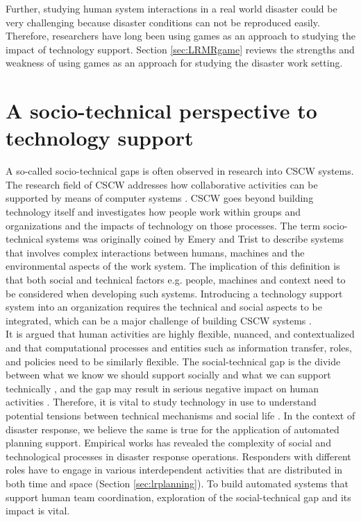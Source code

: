 Further, studying human system interactions in a real world disaster could be very challenging because disaster conditions can not be reproduced easily. Therefore, researchers have long been using games as an approach to studying the impact of technology support.  Section \ref{sec:LRMRgame} reviews the strengths and weakness of using games as an approach for studying the disaster work setting. \\


\section{A socio-technical perspective to technology support} \label{sec:LRSocialTechnical}

A so-called socio-technical gaps is often observed in research into \acf{CSCW} systems. The research field of \ac{CSCW} addresses how collaborative activities can be supported by means of computer systems \citep{Carstensen1999}.  \ac{CSCW} goes beyond building technology itself and investigates how people work within groups and organizations and the impacts of technology on those processes. The term socio-technical systems was originally coined by Emery and Trist \citep{Ropohl1999} to describe systems that involves complex interactions between humans, machines and the environmental aspects of the work system. The implication of this definition is that both social and technical factors e.g. people, machines and context need to be considered when developing such systems. Introducing a technology support system into an organization requires the technical and social aspects to be integrated, which can be a major challenge of building \ac{CSCW} systems \citep{Ackerman2000}. \\

It is argued \citep{Ackerman2000} that human activities are highly flexible, nuanced, and contextualized and that computational processes and entities such as information transfer, roles, and policies need to be similarly flexible. The social-technical gap is the divide between what we know we should support socially and what we can support technically \citep{Ackerman2000}, and the gap may result in serious negative impact on human activities \citep{Bowers1994,Abbott1994a}. Therefore, it is vital to study technology in use to understand potential tensions between technical mechanisms and social life \citep{Bowers1994}.  In the context of disaster response, we believe the same is true for the application of automated planning support. Empirical works \citep{Kopena2008,Fischer2015,Zerger2003} has revealed the complexity of social and technological processes in disaster response operations. Responders with different roles have to engage in various interdependent activities that are distributed in both time and space (Section \ref{sec:lrplanning}). To build automated systems that support human team coordination, exploration of the social-technical gap and its impact is vital. \\ 

